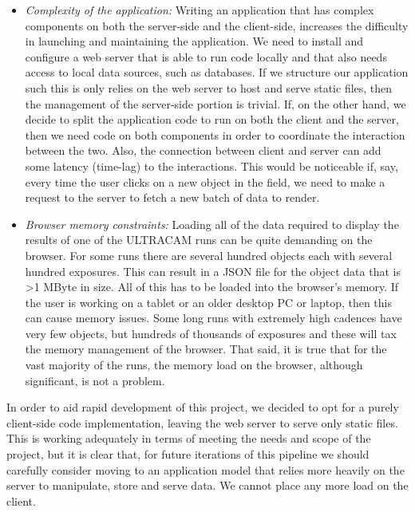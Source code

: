 \begin{itemize}
  \item \emph{Complexity of the application:} Writing an application that has complex components on both the server-side and the client-side, increases the difficulty in launching and maintaining the application. We need to install and configure a web server that is able to run code locally and that also needs access to local data sources, such as databases. If we structure our application such this is only relies on the web server to host and serve static files, then the management of the server-side portion is trivial. If, on the other hand, we decide to split the application code to run on both the client and the server, then we need code on both components in order to coordinate the interaction between the two. Also, the connection between client and server can add some latency (time-lag) to the interactions. This would be noticeable if, say, every time the user clicks on a new object in the field, we need to make a request to the server to fetch a new batch of data to render.  

  \item \emph{Browser memory constraints:} Loading all of the data required to display the results of one of the ULTRACAM runs can be quite demanding on the browser. For some runs there are several hundred objects each with several hundred exposures. This can result in a JSON file for the object data that is \textgreater 1 MByte in size. All of this has to be loaded into the browser's memory. If the user is working on a tablet or an older desktop PC or laptop, then this can cause memory issues. Some long runs with extremely high cadences have very few objects, but hundreds of thousands of exposures and these will tax the memory management of the browser. That said, it is true that for the vast majority of the runs, the memory load on the browser, although significant, is not a problem. 
\end{itemize}

In order to aid rapid development of this project, we decided to opt for a purely client-side code implementation, leaving the web server to serve only static files. This is working adequately in terms of meeting the needs and scope of the project, but it is clear that, for future iterations of this pipeline we should carefully consider moving to an application model that relies more heavily on the server to manipulate, store and serve data. We cannot place any more load on the client. 

